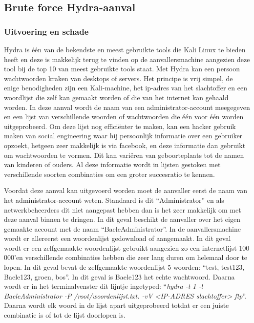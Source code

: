 \documentclass[pdftex,a4paper,12pt]{report}
\begin{document}
\subsection{Brute force Hydra-aanval}
\subsubsection{Uitvoering en schade}
Hydra is één van de bekendste en meest gebruikte tools die Kali Linux te bieden heeft en deze is makkelijk terug te vinden op de aanvallersmachine aangezien deze tool bij de top 10 van meest gebruikte tools staat. Met Hydra kan een persoon wachtwoorden kraken van desktops of servers. Het principe is vrij simpel, de enige benodigheden zijn een Kali-machine, het ip-adres van het slachtoffer en een woordlijst die zelf kan gemaakt worden of die van het internet kan gehaald worden. In deze aanval wordt de naam van een administrator-account meegegeven en een lijst van verschillende woorden of wachtwoorden die één voor één worden uitgeprobeerd. Om deze lijst nog efficiënter te maken, kan een hacker gebruik maken van social engineering waar hij persoonlijk informatie over een gebruiker opzoekt, hetgeen zeer makkelijk is via facebook, en deze informatie dan gebruikt om wachtwoorden te vormen. Dit kan variëren van geboorteplaats tot de namen van kinderen of ouders. Al deze informatie wordt in lijsten gestoken met verschillende soorten combinaties om een groter succesratio te kennen. \citep{Wilde2013} \newline 

Voordat deze aanval kan uitgevoerd worden moet de aanvaller eerst de naam van het administrator-account weten. Standaard is dit "`Administrator"' en als netwerkbeheerders dit niet aangepast hebben dan is het zeer makkelijk om met deze aanval binnen te dringen. In dit geval beschikt de aanvaller over het eigen gemaakte account met de naam "`BaeleAdministrator"'. In de aanvallersmachine wordt er allereerst een woordenlijst gedownload of aangemaakt. In dit geval wordt er een zelfgemaakte woordenlijst gebruikt aangezien zo een internetlijst 100 000'en verschillende combinaties hebben die zeer lang duren om helemaal door te lopen. In dit geval bevat de zelfgemaakte woordenlijst 5 woorden: "`test, test123, Baele123, groen, bos"'. In dit geval is Baele123 het echte wachtwoord. Daarna wordt er in het terminalvenster dit lijntje ingetyped: "`\textit{hydra -t 1 -l BaeleAdministrator -P /root/woordenlijst.txt. -vV <IP-ADRES slachtoffer> ftp}"'. Daarna wordt elk woord in de lijst apart uitgeprobeerd totdat er een juiste combinatie is of tot de lijst doorlopen is. \citep{Moon2013} \newline 
\end{document}
